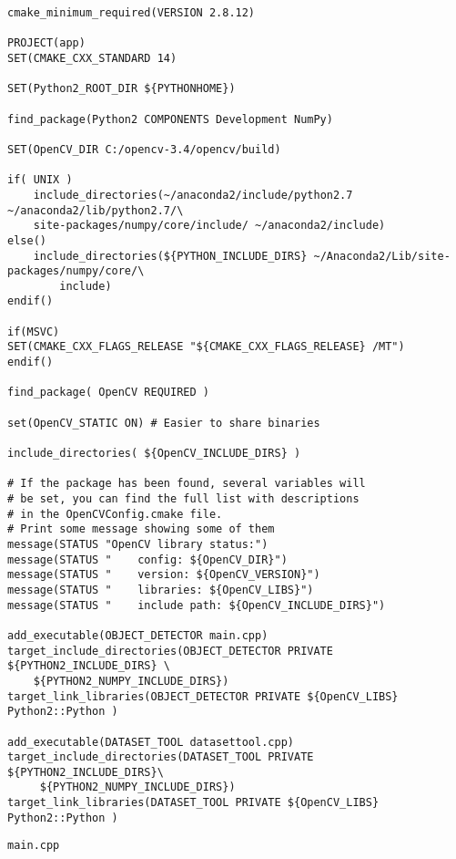 \label{lst:cmake}
\begin{verbatim}
cmake_minimum_required(VERSION 2.8.12)

PROJECT(app)
SET(CMAKE_CXX_STANDARD 14)

SET(Python2_ROOT_DIR ${PYTHONHOME})

find_package(Python2 COMPONENTS Development NumPy)

SET(OpenCV_DIR C:/opencv-3.4/opencv/build)

if( UNIX )
    include_directories(~/anaconda2/include/python2.7 ~/anaconda2/lib/python2.7/\
    site-packages/numpy/core/include/ ~/anaconda2/include)
else()
    include_directories(${PYTHON_INCLUDE_DIRS} ~/Anaconda2/Lib/site-packages/numpy/core/\
    	include)
endif()

if(MSVC)
SET(CMAKE_CXX_FLAGS_RELEASE "${CMAKE_CXX_FLAGS_RELEASE} /MT")
endif()

find_package( OpenCV REQUIRED )

set(OpenCV_STATIC ON) # Easier to share binaries

include_directories( ${OpenCV_INCLUDE_DIRS} )

# If the package has been found, several variables will
# be set, you can find the full list with descriptions
# in the OpenCVConfig.cmake file.
# Print some message showing some of them
message(STATUS "OpenCV library status:")
message(STATUS "    config: ${OpenCV_DIR}")
message(STATUS "    version: ${OpenCV_VERSION}")
message(STATUS "    libraries: ${OpenCV_LIBS}")
message(STATUS "    include path: ${OpenCV_INCLUDE_DIRS}")

add_executable(OBJECT_DETECTOR main.cpp)
target_include_directories(OBJECT_DETECTOR PRIVATE ${PYTHON2_INCLUDE_DIRS} \
	${PYTHON2_NUMPY_INCLUDE_DIRS})
target_link_libraries(OBJECT_DETECTOR PRIVATE ${OpenCV_LIBS} Python2::Python )

add_executable(DATASET_TOOL datasettool.cpp)
target_include_directories(DATASET_TOOL PRIVATE ${PYTHON2_INCLUDE_DIRS}\
	 ${PYTHON2_NUMPY_INCLUDE_DIRS})
target_link_libraries(DATASET_TOOL PRIVATE ${OpenCV_LIBS} Python2::Python )
\end{verbatim}

\clearpage
\begin{verbatim}
main.cpp
\end{verbatim}

